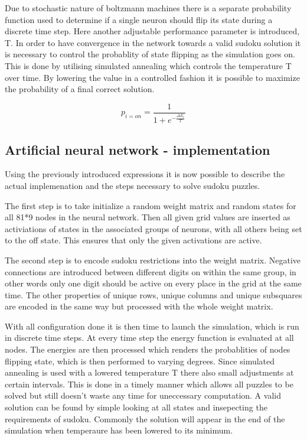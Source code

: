 \documentclass[a4paper,11pt]{kth-mag}
\begin{document}
Due to stochastic nature of boltzmann machines there is a separate probability function used to determine if a single neuron should flip its state during a discrete time step. \cite{boltzmann2}
Here another adjustable performance parameter is introduced, T.
In order to have convergence in the network towards a valid sudoku solution it is necessary to control the probablity of state flipping as the simulation goes on.
This is done by utilising simulated annealing which controls the temperature T over time.
By lowering the value in a controlled fashion it is possible to maximize the probability of a final correct solution.

\[
p_{i=on} = \frac{1}{1+e^{-\frac{\Delta E_{i}}{T}}}
\]

\subsection{Artificial neural network - implementation}

Using the previously introduced expressions it is now possible to describe the actual implemenation and the steps necessary to solve sudoku puzzles.
\newline

The first step is to take initialize a random weight matrix and random states for all 81*9 nodes in the neural network.
Then all given grid values are inserted as activiations of states in the associated groups of neurons, with all others being set to the off state.
This ensures that only the given activations are active.
\newline

The second step is to encode sudoku restrictions into the weight matrix.
Negative connections are introduced between different digits on within the same group, in other words only one digit should be active on every place in the grid at the same time.
The other properties of unique rows, unique columns and unique subsquares are encoded in the same way but processed with the whole weight matrix.
\newline

With all configuration done it is then time to launch the simulation, which is run in discrete time steps.
At every time step the energy function is evaluated at all nodes.
The energies are then processed which renders the probablities of nodes flipping state, which is then performed to varying degrees.
Since simulated annealing is used with a lowered temperature T there also small adjustments at certain intervals.
This is done in a timely manner which allows all puzzles to be solved but still doesn't waste any time for uneccessary computation.
\newline
A valid solution can be found by simple looking at all states and insepecting the requirements of sudoku.
Commonly the solution will appear in the end of the simulation when temperaure has been lowered to its minimum.
\end{document}
